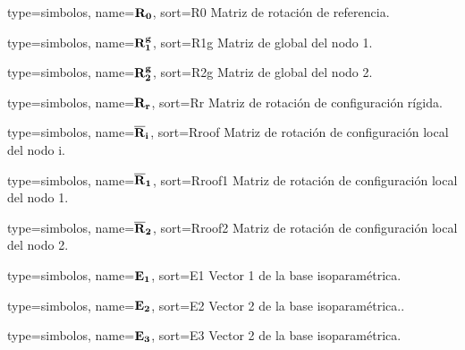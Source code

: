 \setglossarypreamble[simbolos]{}

{
	type={simbolos},
	name={$\bf{R}_0$}, %
	sort={R0} %
}
{Matriz de rotación de referencia.}

{
	type={simbolos},
	name={$\bf{R}_1^g$}, %
	sort={R1g} %
}
{Matriz de global del nodo 1.}

{
	type={simbolos},
	name={$\bf{R}_2^g$}, %
	sort={R2g} %
}
{Matriz de global del nodo 2.}

{
	type={simbolos},
	name={$\bf{R}_r$}, %
	sort={Rr} %
}
{Matriz de rotación de configuración rígida.}


{
	type={simbolos},
	name={$\bf{\overline{R}}_i$}, %
	sort={Rroof} %
}
{Matriz de rotación de configuración local del nodo i.}


{
	type={simbolos},
	name={$\bf{\overline{R}}_1$}, %
	sort={Rroof1} %
}
{Matriz de rotación de configuración local del nodo 1.}

{
	type={simbolos},
	name={$\bf{\overline{R}}_2$}, %
	sort={Rroof2} %
}
{Matriz de rotación de configuración local del nodo 2.}

{
	type={simbolos},
	name={$\bf{E_1}$}, %
	sort={E1} %
}
{Vector 1 de la base isoparamétrica.}

{
	type={simbolos},
	name={$\bf{E_2}$}, %
	sort={E2} %
}
{Vector 2 de la base isoparamétrica..}

{
	type={simbolos},
	name={$\bf{E_3}$}, %
	sort={E3} %
}
{Vector 2 de la base isoparamétrica.}

